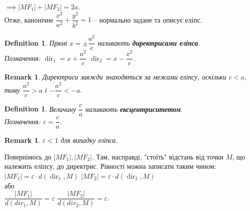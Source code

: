 \documentclass[a4paper, 10pt]{extarticle}
\def\bigline{\vspace{5mm}\\}
\theoremstyle{theoremdd}
\theoremstyle{theoremdd}
\newtheorem{definition}[theorem]{Definition}
\theoremstyle{theoremdd}
\theoremstyle{theoremdd}
\theoremstyle{theoremdd}
\theoremstyle{theoremdd}
\newtheorem{remark}[theorem]{Remark}
\theoremstyle{theoremdd}
\theoremstyle{theoremdd}
\DeclareMathOperator{\dir}{dir}
\begin{document}
$\implies |MF_1| + |MF_2| = 2a$.
\bigline
Отже, канонічне $\dfrac{x^2}{a^2} + \dfrac{y^2}{b^2} = 1$ -- нормально задане та описує еліпс.
\begin{figure}[H]
\centering
{}
\end{figure}

\begin{definition}
Прямі $x = \pm \dfrac{a^2}{c}$ називають \textbf{директрисами еліпса}.\\
Позначення: $\dir_1 = x + \dfrac{a^2}{c}$ \qquad $\dir_2 = x - \dfrac{x^2}{c}$.
\end{definition}

\begin{remark}
Директриси завжди знаходяться за межами еліпсу, оскільки $c < a$, тому $\dfrac{a^2}{c} > a$ і $-\dfrac{a^2}{c} < -a$.
\end{remark}

\begin{definition}
Величину $\dfrac{c}{a}$ називають \textbf{ексцентриситетом}.\\
Позначення: $\varepsilon = \dfrac{c}{a}$.
\end{definition}

\begin{remark}
$\varepsilon < 1$ для випадку еліпса.
\end{remark}

Повернімось до $|MF_1|,|MF_2|$. Там, насправді, "стоїть" \textrm{} відстань від точки $M$, що належить еліпсу, до директрис. Рівності можна записати таким чином:\\
$|MF_1| = \varepsilon \cdot d(\dir_1, M)$ \qquad $|MF_2| = \varepsilon \cdot d(\dir_2, M)$\\
або\\
$\dfrac{|MF_1|}{d(dir_1, M)} = \varepsilon$ \qquad $\dfrac{|MF_2|}{d(dir_2, M)} = \varepsilon$.
\end{document}
